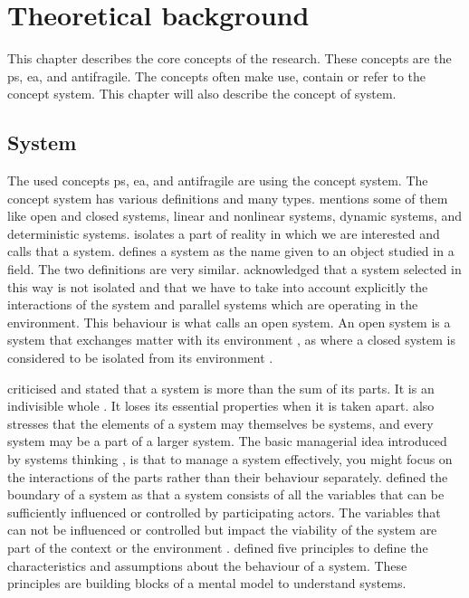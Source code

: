 \chapter{Theoretical background}
\label{ch:theoreticalbackground}
This chapter describes the core concepts of the research. These concepts are the \gls{ps}, \acrlong{ea}, and \gls{antifragile}. The concepts often make use, contain or refer to the concept system. This chapter will also describe the concept of system.

\section{System}
\label{sec:tbsystem}
The used concepts \gls{ps}, \acrshort{ea}, and \gls{antifragile} are using the concept system. The concept system has various definitions and many types. \textcite{Rickles2007} mentions some of them like open and closed systems, linear and nonlinear systems, dynamic systems, and deterministic systems. \textcite[p.~13]{Mannaert2016} isolates a part of reality in which we are interested and calls that a system. \textcite[p.~933]{Rickles2007} defines a system as the name given to an object studied in a field. The two definitions are very similar. \textcite[p.~13--14]{Mannaert2016} acknowledged that a system selected in this way is not isolated and that we have to take into account explicitly the interactions of the system and parallel systems which are operating in the environment. This behaviour is what \textcite[p.~32]{Bertalanffy1968} calls an open system. An open system is a system that exchanges matter with its environment \parencite[p.~32]{Bertalanffy1968}, as where a closed system is considered to be isolated from its environment \parencite[p.~39]{Bertalanffy1968}.

\textcite[p.~51--69]{Ackoff1964} criticised \textcite{Bertalanffy1951} and stated that a system is more than the sum of its parts. It is an indivisible whole \parencite[p.~664]{Ackoff1973}. It loses its essential properties when it is taken apart. \textcite[p.~664]{Ackoff1973} also stresses that the elements of a system may themselves be systems, and every system may be a part of a larger system. The basic managerial idea introduced by systems thinking \parencite{Ackoff1964}, is that to manage a system effectively, you might focus on the interactions of the parts rather than their behaviour separately. \textcite[p.~182]{Gharajedaghi2011} defined the boundary of a system as that a system consists of all the variables that can be sufficiently influenced or controlled by participating actors. The variables that can not be influenced or controlled but impact the viability of the system are part of the context \parencite[p.~183]{Gharajedaghi2011} or the environment \parencite[p.~13--14]{Mannaert2016}. \textcite[p.~29]{Gharajedaghi2011} defined five principles to define the characteristics and assumptions about the behaviour of a system. These principles are building blocks of a mental model to understand systems.

